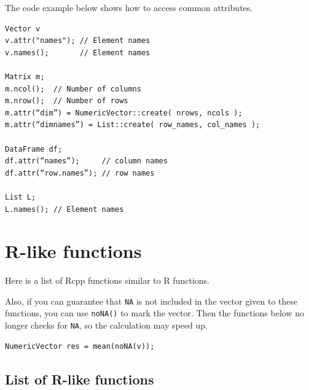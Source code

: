 \documentclass[
]{book}
\begin{document}
The code example below shows how to access common attributes.

\begin{verbatim}
Vector v
v.attr("names"); // Element names
v.names();       // Element names

Matrix m;
m.ncol();  // Number of columns
m.nrow();  // Number of rows
m.attr(“dim”) = NumericVector::create( nrows, ncols );
m.attr(“dimnames”) = List::create( row_names, col_names );

DataFrame df;
df.attr(“names”);     // column names
df.attr(“row.names”); // row names

List L;
L.names(); // Element names
\end{verbatim}

\hypertarget{r-like-functions}{%
\chapter{R-like functions}\label{r-like-functions}}

Here is a list of Rcpp functions similar to R functions.

Also, if you can guarantee that \texttt{NA} is not included in the vector given to these functions, you can use \texttt{noNA()} to mark the vector. Then the functions below no longer checks for \texttt{NA}, so the calculation may speed up.

\begin{verbatim}
NumericVector res = mean(noNA(v));
\end{verbatim}

\hypertarget{list-of-r-like-functions}{%
\section{List of R-like functions}\label{list-of-r-like-functions}}
\end{document}
